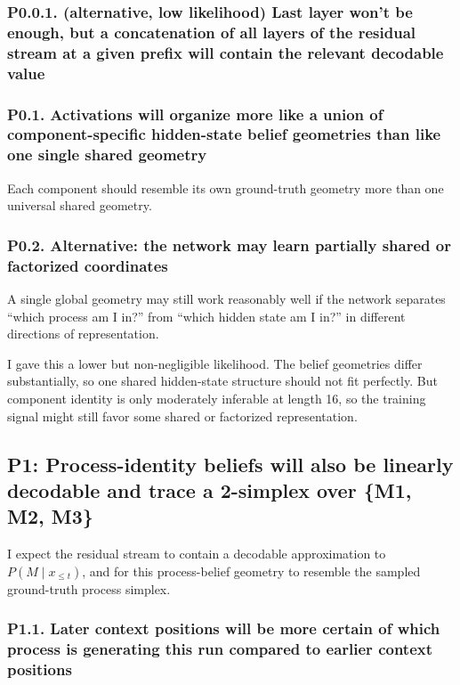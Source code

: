 \documentclass[11pt]{article}
\begin{document}
\subsubsection*{P0.0.1. (alternative, low likelihood) Last layer won't be enough, but a concatenation of all layers of the residual stream at a given prefix will contain the relevant decodable value}

\subsubsection*{P0.1. Activations will organize more like a union of component-specific hidden-state belief geometries than like one single shared geometry}

Each component should resemble its own ground-truth geometry more than one universal shared geometry.

\subsubsection*{P0.2. Alternative: the network may learn partially shared or factorized coordinates}

A single global geometry may still work reasonably well if the network separates ``which process am I in?'' from ``which hidden state am I in?'' in different directions of representation.

I gave this a lower but non-negligible likelihood. The belief geometries differ substantially, so one shared hidden-state structure should not fit perfectly. But component identity is only moderately inferable at length 16, so the training signal might still favor some shared or factorized representation.

\subsection{P1: Process-identity beliefs will also be linearly decodable and trace a 2-simplex over \{M1, M2, M3\}}

I expect the residual stream to contain a decodable approximation to $P(M \mid x_{\le t})$, and for this process-belief geometry to resemble the sampled ground-truth process simplex.

\subsubsection*{P1.1. Later context positions will be more certain of which process is generating this run compared to earlier context positions}
\end{document}
